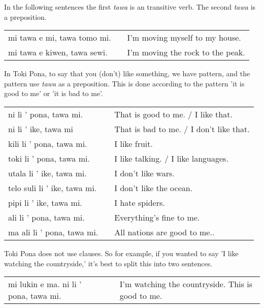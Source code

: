 In the following sentences the first \textit{tawa} is an transitive verb.
The second \textit{tawa} is a preposition.

\begin{supertabular}{p{5,5cm}|ll}
    mi tawa e mi, tawa tomo mi. &  & I'm moving myself to my house.   \\
    mi tawa e kiwen, tawa sewi. &  & I'm moving the rock to the peak. \\
\end{supertabular}

%
In Toki Pona, to say that you (don't) like something, we have pattern, and the pattern use \textit{tawa} as a preposition.
This is done according to the pattern 'it is good to me' or 'it is bad to me'.

\begin{supertabular}{p{5,5cm}|ll}
    ni li ' pona, tawa mi.       &  & That is good to me. / I like that.      \\
    ni li ' ike, tawa mi         &  & That is bad to me. / I don't like that. \\
    kili li ' pona, tawa mi.     &  & I like fruit.                           \\
    toki li ' pona, tawa mi.     &  & I like talking. / I like languages.     \\
    utala li ' ike, tawa mi.     &  & I don't like wars.                      \\
    telo suli li ' ike, tawa mi. &  & I don't like the ocean.                 \\
    pipi li ' ike, tawa mi.      &  & I hate spiders.                         \\
    ali li ' pona, tawa mi.      &  & Everything's fine to me.                \\
    ma ali li ' pona, tawa mi.   &  & All nations are good to me..            \\
\end{supertabular}

%
%
Toki Pona does not use clauses.
So for example, if you wanted to say 'I like watching the countryside,' it's best to split this into two sentences.

\begin{supertabular}{p{5,5cm}|ll}
    mi lukin e ma. ni li ' pona, tawa mi. &  & I'm watching the countryside. This is good to me. \\
\end{supertabular}

